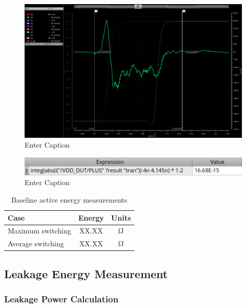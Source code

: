 \documentclass[12pt,letterpaper]{article}
\begin{document}
\begin{figure}[H]
    \centering
    \includegraphics[width=\linewidth]{writeup//figures//baseline//active_energy/avg_switching_energy_current.png}
    \caption{Enter Caption}
\end{figure}

\begin{figure}[H]
    \centering
    \includegraphics[width=0.5\linewidth]{writeup//figures//baseline//active_energy/avg_switching_energy_value.png}
    \caption{Enter Caption}
\end{figure}

\begin{table}[H]
\centering
\caption{Baseline active energy measurements}
\label{tab:baseline_active_energy}
\begin{tabular}{@{}lcc@{}}
\toprule
\textbf{Case} & \textbf{Energy} & \textbf{Units} \\
\midrule
Maximum switching & XX.XX & fJ \\
Average switching & XX.XX & fJ \\
\bottomrule
\end{tabular}
\end{table}

\subsection{Leakage Energy Measurement}

\subsubsection{Leakage Power Calculation}
\end{document}
